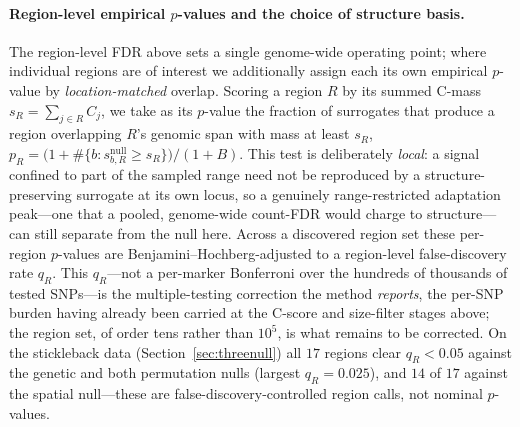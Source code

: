 \documentclass[11pt]{article}
\begin{document}
\paragraph{Region-level empirical $p$-values and the choice of structure basis.}
The region-level FDR above sets a single genome-wide operating point; where
individual regions are of interest we additionally assign each its own empirical
$p$-value by \emph{location-matched} overlap. Scoring a region $R$ by its summed
C-mass $s_R = \sum_{j\in R} C_j$, we take as its $p$-value the fraction of
surrogates that produce a region overlapping $R$'s genomic span with mass at least
$s_R$, $p_R = \bigl(1 + \#\{b : s^{\mathrm{null}}_{b,R} \ge s_R\}\bigr)/(1+B)$.
This test is deliberately \emph{local}: a signal confined to part of the sampled
range need not be reproduced by a structure-preserving surrogate at its own locus,
so a genuinely range-restricted adaptation peak---one that a pooled, genome-wide
count-FDR would charge to structure---can still separate from the null here.
Across a discovered region set these per-region $p$-values are
Benjamini--Hochberg-adjusted to a region-level false-discovery rate $q_R$. This
$q_R$---not a per-marker Bonferroni over the hundreds of thousands of tested
SNPs---is the multiple-testing correction the method \emph{reports}, the per-SNP
burden having already been carried at the C-score and size-filter stages above; the
region set, of order tens rather than $10^5$, is what remains to be corrected. On the
stickleback data (Section~\ref{sec:threenull}) all $17$ regions clear $q_R < 0.05$
against the genetic and both permutation nulls (largest $q_R = 0.025$), and $14$ of
$17$ against the spatial null---these are false-discovery-controlled region calls,
not nominal $p$-values.
\end{document}
